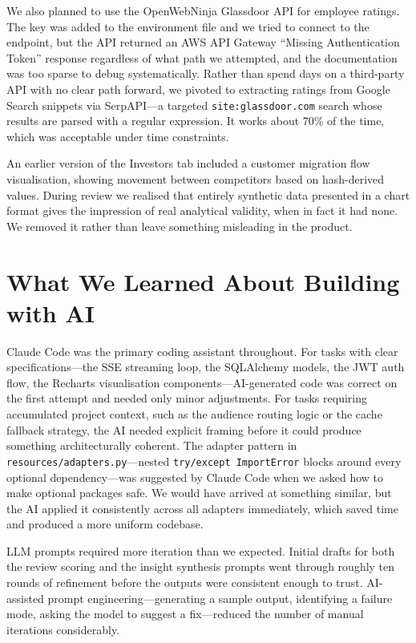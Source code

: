 \documentclass[9pt, a4paper, twocolumn]{article}
\begin{document}
We also planned to use the OpenWebNinja Glassdoor API for employee ratings. The key was added to the environment file and we tried to connect to the endpoint, but the API returned an AWS API Gateway ``Missing Authentication Token'' response regardless of what path we attempted, and the documentation was too sparse to debug systematically. Rather than spend days on a third-party API with no clear path forward, we pivoted to extracting ratings from Google Search snippets via SerpAPI---a targeted \texttt{site:glassdoor.com} search whose results are parsed with a regular expression. It works about 70\% of the time, which was acceptable under time constraints.

An earlier version of the Investors tab included a customer migration flow visualisation, showing movement between competitors based on hash-derived values. During review we realised that entirely synthetic data presented in a chart format gives the impression of real analytical validity, when in fact it had none. We removed it rather than leave something misleading in the product.

\section{What We Learned About Building with AI}

Claude Code was the primary coding assistant throughout. For tasks with clear specifications---the SSE streaming loop, the SQLAlchemy models, the JWT auth flow, the Recharts visualisation components---AI-generated code was correct on the first attempt and needed only minor adjustments. For tasks requiring accumulated project context, such as the audience routing logic or the cache fallback strategy, the AI needed explicit framing before it could produce something architecturally coherent. The adapter pattern in \texttt{resources/adapters.py}---nested \texttt{try/except ImportError} blocks around every optional dependency---was suggested by Claude Code when we asked how to make optional packages safe. We would have arrived at something similar, but the AI applied it consistently across all adapters immediately, which saved time and produced a more uniform codebase.

LLM prompts required more iteration than we expected. Initial drafts for both the review scoring and the insight synthesis prompts went through roughly ten rounds of refinement before the outputs were consistent enough to trust. AI-assisted prompt engineering---generating a sample output, identifying a failure mode, asking the model to suggest a fix---reduced the number of manual iterations considerably.
\end{document}
